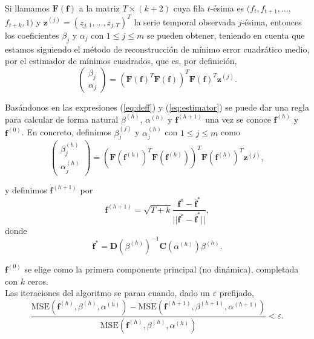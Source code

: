 Si llamamos $\mathbf{F}(\mathbf{f})$ a la matriz $T \times (k+2)$ cuya fila $t$-ésima es $(f_t, f_{t+1}, \dots,$ $ f_{t+k},1)$ y $\mathbf{z}^{(j)} = (z_{j,1}, \dots, z_{j,T})^T$ la serie temporal observada $j$-ésima, entonces los coeficientes $\beta_j$ y $\alpha_j$ con $1 \leq j \leq m$ se pueden obtener, teniendo en cuenta que estamos siguiendo el método de reconstrucción de mínimo error cuadrático medio, por el estimador de mínimos cuadrados, que es, por definición,
\begin{equation}\label{eq:estimator}
	\left( \begin{array}{c}
	\beta_j \\
	\alpha_j  \end{array} \right) = 
	(\mathbf{F}(\mathbf{f})^T \mathbf{F}(\mathbf{f}))^T \mathbf{F}(\mathbf{f})^T \mathbf{z}^{(j)}.   
\end{equation}

Basándonos en las expresiones (\ref{eq:deff}) y (\ref{eq:estimator}) se puede dar una regla para calcular de forma natural $\beta^{(h)}$, $\alpha^{(h)}$ y $\mathbf{f}^{(h+1)}$ una vez se conoce $\mathbf{f}^{(h)}$ y $\mathbf{f}^{(0)}$. En concreto, definimos $\beta_j^{(j)}$ y $\alpha_j^{(h)}$ con $1 \leq j \leq m$ como
\[	\left( \begin{array}{c}
	\beta_j^{(h)} \\
	\alpha_j^{(h)}  \end{array} \right) = 
	(\mathbf{F}(\mathbf{f}^{(h)})^T \mathbf{F}(\mathbf{f}^{(h)}))^T \mathbf{F}(\mathbf{f}^{(h)})^T \mathbf{z}^{(j)},
\]

y definimos $\mathbf{f}^{(h+1)}$ por
\[	\mathbf{f}^{(h+1)} = \sqrt{T+k} \frac{\mathbf{f}^* - \overline{\mathbf{f}}^*}{||\mathbf{f}^* - \overline{\mathbf{f}}^*||},	\]
donde
\[	\mathbf{f}^* = \mathbf{D}(\beta^{(h)})^{-1} \mathbf{C}(\alpha^{(h)})\beta^{(h)}.	\]

$\mathbf{f}^{(0)}$ se elige como la primera componente principal (no dinámica), completada con $k$ ceros.\\

Las iteraciones del algoritmo se paran cuando, dado un $\varepsilon$ prefijado,
\[	\frac{\text{MSE}(\mathbf{f}^{(h)},\beta^{(h)},\alpha^{(h)}) - \text{MSE}(\mathbf{f}^{(h+1)},\beta^{(h+1)},\alpha^{(h+1)})}{\text{MSE}(\mathbf{f}^{(h)},\beta^{(h)},\alpha^{(h)})} < \varepsilon.	\]







%